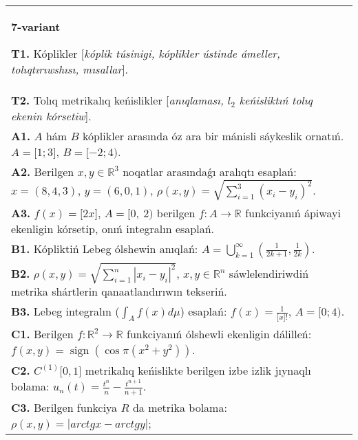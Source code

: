 \documentclass{article}
\DeclareMathOperator{\sign}{sign}
\begin{document}
\begin{tabular}{m{17cm}}
\textbf{7-variant}
\newline

\textbf{T1.} Kóplikler [\textit{kóplik túsinigi, kóplikler ústinde ámeller, tolıqtırıwshısı, mısallar}]. \\
\textbf{T2.} Tolıq metrikalıq keńislikler [\textit{anıqlaması, \(l_{2}\) keńisliktıń tolıq ekenin kórsetiw}]. \\
\textbf{A1.} \(A\) hám \(B\) kóplikler arasında óz ara bir mánisli sáykeslik ornatıń. \(A = \lbrack 1;3\rbrack\), \(B = \lbrack - 2;4)\). \\
\textbf{A2.} Berilgen \(x,y \in \mathbb{R}^{3}\) noqatlar arasındaǵı aralıqtı esaplań: \(x = (8,4,3)\), \(y = (6,0,1)\), \(\rho(x,y) = \sqrt{{\sum_{i = 1}^{3}\left( x_{i} - y_{i} \right)^{2}}}\). \\
\textbf{A3.} \(f(x) = \lbrack 2x\rbrack\), \(A = \lbrack 0,\ 2)\) berilgen \(f:A\rightarrow\mathbb{R}\) funkciyanıń ápiwayi ekenligin kórsetip, onıń integralın esaplań. \\
\textbf{B1.} Kópliktiń Lebeg ólshewin anıqlań: \(A = \bigcup_{k = 1}^{\infty}\left( \frac{1}{2k + 1},\frac{1}{2k} \right)\). \\
\textbf{B2.} \(\rho(x,y) = \sqrt{\sum_{i = 1}^{n}\left| x_{i} - y_{i} \right|^{2}}\), \(x,y \in \mathbb{R}^{n}\) sáwlelendiriwdiń metrika shártlerin qanaatlandırıwın tekseriń. \\
\textbf{B3.} Lebeg integralın (\(\int_{A}^{}{f(x)d\mu}\)) esaplań: \(f(x) = \frac{1}{\lbrack x\rbrack!}\), \(A = \lbrack 0;4)\). \\
\textbf{C1.} Berilgen \(f:\mathbb{R}^{2}\mathbb{\rightarrow R}\) funkciyanıń ólshewli ekenligin dálilleń: \(f(x,y) = \sign\left( \cos\pi\left( x^{2} + y^{2} \right) \right)\). \\
\textbf{C2.} \(C^{(1)}\lbrack 0,1\rbrack\) metrikalıq keńislikte berilgen izbe izlik jıynaqlı bolama: \(u_{n}(t) = \frac{t^{n}}{n} - \frac{t^{n + 1}}{n + 1}\). \\
\textbf{C3.} Berilgen funkciya \(R\) da metrika bolama: \(\rho(x,y) = |arctgx - arctgy|\); \\

\end{tabular}
\vspace{1cm}
\end{document}
